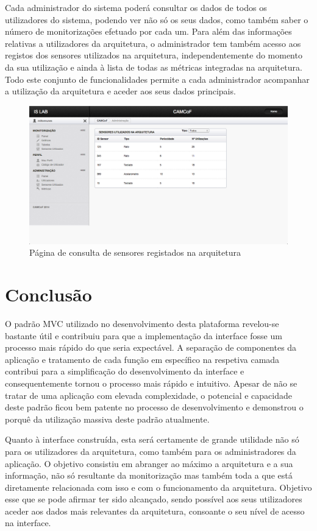 Cada administrador do sistema poderá consultar os dados de todos os utilizadores do sistema, podendo ver não só os seus dados, como também saber o número de monitorizações efetuado por cada um. Para além das informações relativas a utilizadores da arquitetura, o administrador tem também acesso aos registos dos sensores utilizados na arquitetura, independentemente do momento da sua utilização e ainda à lista de todas as métricas integradas na arquitetura. Todo este conjunto de funcionalidades permite a cada administrador acompanhar a utilização da arquitetura e aceder aos seus dados principais.

\begin{figure}[htb]
   \centering
   \includegraphics[scale=0.29]{Images/sensores1.png}
   \caption{Página de consulta de sensores registados na arquitetura}
\end{figure}


\section{Conclusão}

O padrão MVC utilizado no desenvolvimento desta plataforma revelou-se bastante útil e contribuiu para que a implementação da interface fosse um processo mais rápido do que seria expectável. A separação de componentes da aplicação e tratamento de cada função em específico na respetiva camada contribui para a simplificação do desenvolvimento da interface e consequentemente tornou o processo mais rápido e intuitivo. Apesar de não se tratar de uma aplicação com elevada complexidade, o potencial e capacidade deste padrão ficou bem patente no processo de desenvolvimento e demonstrou o porquê da utilização massiva deste padrão atualmente.

Quanto à interface construída, esta será certamente de grande utilidade não só para os utilizadores da arquitetura, como também para os administradores da aplicação. O objetivo consistiu em abranger ao máximo a arquitetura e a sua informação, não só resultante da monitorização mas também toda a que está diretamente relacionada com isso e com o funcionamento da arquitetura. Objetivo esse que se pode afirmar ter sido alcançado, sendo possível aos seus utilizadores aceder aos dados mais relevantes da arquitetura, consoante o seu nível de acesso na interface.

